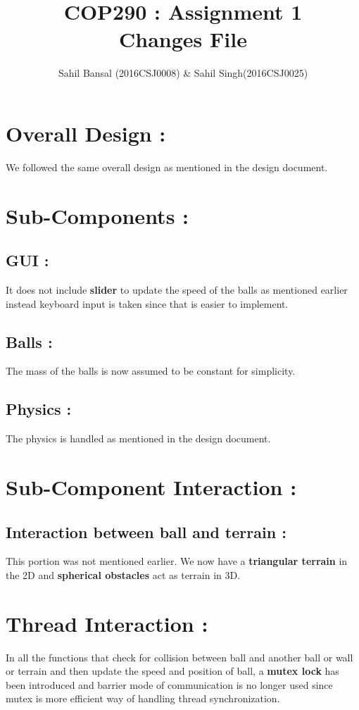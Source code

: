 \documentclass[]{article}
\title{\textbf{COP290 : Assignment 1 \\ Changes File}}
\author{Sahil Bansal (2016CSJ0008) \& Sahil Singh(2016CSJ0025)}
\begin{document}
\maketitle

\section{\LARGE Overall Design :}
\Large
We followed the same overall design as mentioned in the design document.

\section{\LARGE Sub-Components :}

\subsection{GUI :}
\Large It does not include \textbf{slider} to update the speed of the balls as mentioned earlier instead keyboard input is taken since that is easier to implement.

\subsection{Balls :}
\Large The mass of the balls is now assumed to be constant for simplicity.

\subsection{Physics :}
\Large The physics is handled as mentioned in the design document.

\section{\LARGE Sub-Component Interaction :}
\subsection{Interaction between ball and terrain :} 
\Large
This portion was not mentioned earlier. We now have a \textbf{triangular terrain} in the 2D and \textbf{spherical obstacles} act as terrain in 3D. 

\section{\LARGE Thread Interaction :}
\Large In all the functions that check for collision between ball and another ball or wall or terrain and then update the speed and position of ball, a \textbf{mutex lock} has been introduced and barrier mode of communication is no longer used since mutex is more efficient way of handling thread synchronization.
\end{document}
